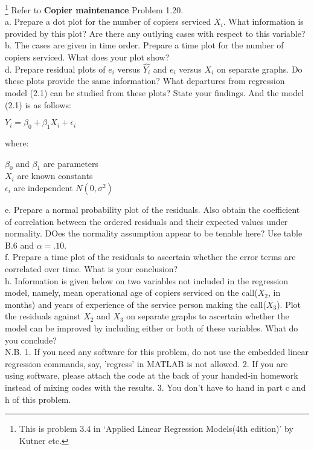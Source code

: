 \documentclass[12pt]{article}
\begin{document}
 {\footnote[1]{This is
problem 3.4 in `Applied Linear Regression Models(4th edition)' by
Kutner etc.} 
 Refer to \textbf{Copier maintenance} Problem 1.20.\\
 a. Prepare a dot plot for the number of copiers serviced $X_i$. What information is provided by this plot? Are there any outlying cases with respect to this variable?\\
 b. The cases are given in time order. Prepare a time plot for the number of copiers serviced. What does your plot show?\\
 d. Prepare residual plots of $e_i$ versus $\hat{Y_i}$ and $e_i$ versus $X_i$ on separate graphs. Do these plots provide the same information? What departures from regression model (2.1) can be studied from these plots? State your findings. And the model (2.1) is as follows:\\
 \begin{center}
 $Y_i=\beta_0+\beta_1 X_i+\epsilon_i$\\
 \end{center}
 where:\\
 \begin{center}
 $\beta_0$ and $\beta_1$ are parameters\\
 $X_i$ are known constants\\
 $\epsilon_i$ are independent $N(0,\sigma^2)$
 \end{center}
 e. Prepare a normal probability plot of the residuals. Also obtain the coefficient of correlation between the ordered residuals and their expected values under normality. DOes the normality assumption appear to be tenable here? Use table B.6 and $\alpha=.10$.\\
 f. Prepare a time plot of the residuals to ascertain whether the error terms are correlated over time. What is your conclusion?\\
 h. Information is given below on two variables not included in the regression model, namely, mean operational age of copiers serviced on the call($X_2$, in months) and years of experience of the service person making the call($X_3$). Plot the residuals against $X_2$ and $X_3$ on separate graphs to ascertain whether the model can be improved by including either or both of these variables. What do you conclude?\\
N.B. 1. If you need any software for this problem, do not use the
embedded linear regression commands, say, 'regress' in MATLAB is not allowed.
2. If you are using software, please attach the code at the back of your
handed-in homework instead of mixing codes with the results.
3. You don't have to hand in part c and h of this problem. 
}
\end{document}
